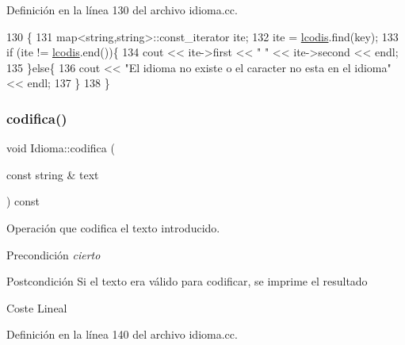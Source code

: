Definición en la línea 130 del archivo idioma.\+cc.


\begin{DoxyCode}
130                                       \{
131   map<string,string>::const\_iterator ite;
132   ite = \hyperlink{class_idioma_ab908f7375f4506b26dd3cd163bc0b8cd}{lcodis}.find(key);
133   \textcolor{keywordflow}{if} (ite != \hyperlink{class_idioma_ab908f7375f4506b26dd3cd163bc0b8cd}{lcodis}.end())\{
134     cout << ite->first << \textcolor{stringliteral}{" "} << ite->second << endl;
135   \}\textcolor{keywordflow}{else}\{
136     cout << \textcolor{stringliteral}{"El idioma no existe o el caracter no esta en el idioma"} << endl;
137   \}
138 \}
\end{DoxyCode}
\mbox{\label{class_idioma_a035524146301a918ba0c019b25c10263}} 
\subsubsection{\texorpdfstring{codifica()}{codifica()}}
{\footnotesize\ttfamily void Idioma\+::codifica (\begin{DoxyParamCaption}\item[{const string \&}]{text }\end{DoxyParamCaption}) const}



Operación que codifica el texto introducido. 

\begin{DoxyPrecond}{Precondición}
{\itshape cierto} 
\end{DoxyPrecond}
\begin{DoxyPostcond}{Postcondición}
Si el texto era válido para codificar, se imprime el resultado 
\end{DoxyPostcond}
\begin{DoxyParagraph}{Coste}
Lineal 
\end{DoxyParagraph}


Definición en la línea 140 del archivo idioma.\+cc.


